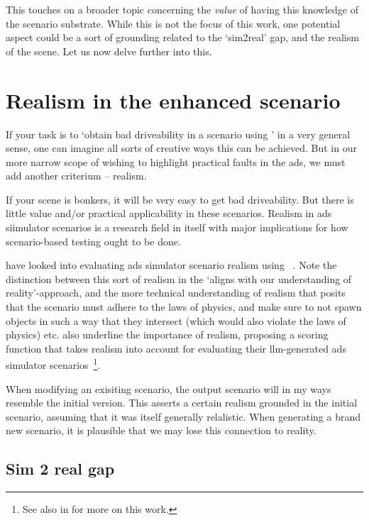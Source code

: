 This touches on a broader topic concerning the \emph{value} of having this knowledge of the
scenario substrate. While this is not the focus of this work, one potential aspect could be a sort
of grounding related to the `sim2real' gap, and the realism of the scene. Let us now delve further
into this.

\section{Realism in the enhanced scenario}

If your task is to `obtain bad driveability in a scenario using ' in a very general
sense, one can imagine all sorts of creative ways this can be achieved. But in our more narrow scope
of wishing to highlight practical faults in the \acrshort{ads}, we must add another criterium --
realism.

If your scene is bonkers, it will be very easy to get bad driveability. But there is little value
and/or practical applicability in these scenarios. Realism in \acrshort{ads} siimulator scenarios is
a research field in itself with major implications for how scenario-based testing ought to be done.

\citeauthor{RealityBites} have looked into evaluating \acrshort{ads} simulator scenario realism
using ~\cite[40]{RealityBites}. Note the distinction between this sort of realism in
the `aligns with our understanding of reality'-approach, and the more technical understanding of
realism that posits that the scenario must adhere to the laws of physics, and make sure to not spawn
objects in such a way that they intersect (which would also violate the laws of physics) etc.
\citeauthor{LLMScenarioChang24} also underline the importance of realism, proposing a scoring
function that takes realism into account for evaluating their \acrshort{llm}-generated
\acrshort{ads} simulator scenarios~\cite[6581-6582]{LLMScenarioChang24}\footnote{See also
     in  for more on this work.}.

When modifying an exisiting scenario, the output scenario will in my ways resemble the initial
version. This asserts a certain realism grounded in the initial scenario, assuming that it was
itself generally relalistic. When generating a brand new scenario, it is plausible that we may lose
this connection to reality.

\subsection{Sim 2 real gap}

